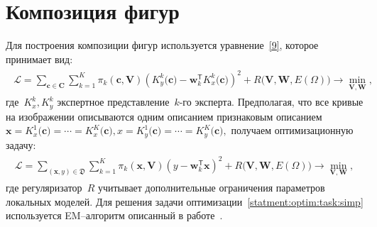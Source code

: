 \documentclass[12pt]{a&t}
\begin{document}
\section{Композиция фигур}
Для построения композиции фигур используется уравнение~\eqref{9}, которое принимает вид:
\begin{gather} 
\label{statment:optim:task}
\begin{aligned}
\mathcal{L} = \sum\limits_{\mathbf{c} \in \mathbf{C}} \sum\limits_{k = 1}^{K} \pi_k(\mathbf{c}, \mathbf{V})\left(K^{k}_y\bigr(\mathbf{c}\bigr) - \mathbf{w}_k^{\mathsf{T}}K^{k}_x\bigr(\mathbf{c}\bigr)\right)^2 + R\bigl(\mathbf{V}, \mathbf{W}, E(\Omega)\bigr) \rightarrow \min_{\mathbf{V}, \mathbf{W}},
\end{aligned}
\end{gather}
где~$K^{k}_x, K^{k}_y$ экспертное представление~$k$-го эксперта. Предполагая, что все кривые на изображении описываются одним описанием признаковым описанием~$\mathbf{x} =K^{1}_x\bigr(\mathbf{c}\bigr)=\cdots=K^{K}_x\bigr( \mathbf{c}\bigr), x= K^{1}_y\bigr(\mathbf{c}\bigr)=\cdots=K^{K}_y\bigr(\mathbf{c}\bigr),$ получаем оптимизационную задачу:
\begin{gather} 
\label{statment:optim:task:simp}
\begin{aligned}
\mathcal{L} = \sum\limits_{\left(\mathbf{x}, y\right) \in \mathfrak{D}} \sum\limits_{k = 1}^{K} \pi_k(\mathbf{x}, \mathbf{V})\left(y - \mathbf{w}_k^{\mathsf{T}}\mathbf{x}\right)^2 + R\bigl(\mathbf{V}, \mathbf{W}, E(\Omega)\bigr) \rightarrow \min_{\mathbf{V}, \mathbf{W}},
\end{aligned}
\end{gather}
где регуляризатор~$R$ учитывает дополнительные ограничения параметров локальных моделей. Для решения задачи оптимизации~\eqref{statment:optim:task:simp} используется EM--алгоритм описанный в работе~\cite{Grabovoy2021}.
\end{document}
